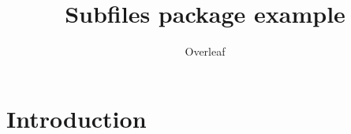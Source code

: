 \documentclass{article}
\title{Subfiles package example}
\author{Overleaf}
\date{ }
\begin{document}
\maketitle

\section{Introduction}


\end{document}
